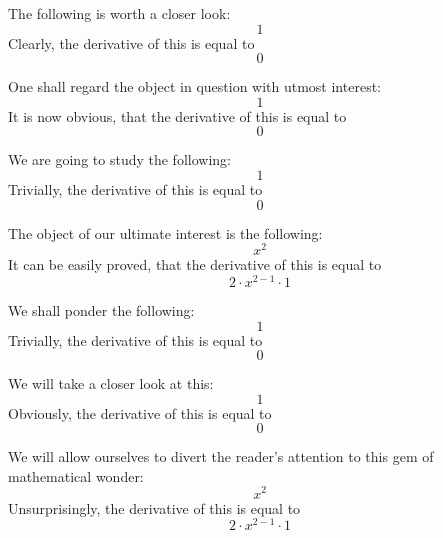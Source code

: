 \documentclass{article}
\begin{document}
The following is worth a closer look:
\begin{equation}
1 
\end{equation}
Clearly, the derivative of this is equal to
\begin{equation}
0 
\end{equation}

One shall regard the object in question with utmost interest:
\begin{equation}
1 
\end{equation}
It is now obvious, that the derivative of this is equal to
\begin{equation}
0 
\end{equation}

We are going to study the following:
\begin{equation}
1 
\end{equation}
Trivially, the derivative of this is equal to
\begin{equation}
0 
\end{equation}

The object of our ultimate interest is the following:
\begin{equation}
x ^{2 } 
\end{equation}
It can be easily proved, that the derivative of this is equal to
\begin{equation}
2 \cdot x ^{2 - 1 } \cdot 1 
\end{equation}

We shall ponder the following:
\begin{equation}
1 
\end{equation}
Trivially, the derivative of this is equal to
\begin{equation}
0 
\end{equation}

We will take a closer look at this:
\begin{equation}
1 
\end{equation}
Obviously, the derivative of this is equal to
\begin{equation}
0 
\end{equation}

We will allow ourselves to divert the reader's attention to this gem of mathematical wonder:
\begin{equation}
x ^{2 } 
\end{equation}
Unsurprisingly, the derivative of this is equal to
\begin{equation}
2 \cdot x ^{2 - 1 } \cdot 1 
\end{equation}
\end{document}
